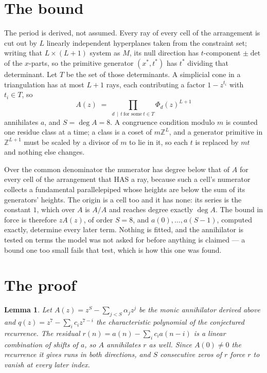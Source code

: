 \documentclass[11pt,a4paper]{article}
\theoremstyle{plain}
\newtheorem{lemma}[theorem]{Lemma}
\theoremstyle{definition}
\begin{document}
\section{The bound}

The period is derived, not assumed. Every ray of every cell of the arrangement is cut out by
$L$ linearly independent hyperplanes taken from the constraint set; writing that $L\times(L+1)$
system as $M$, its null direction has $t$-component $\pm\det$ of the $x$-parts, so the
primitive generator $(x^*,t^*)$ has $t^*$ dividing that determinant. Let $T$ be the set of
those determinants. A simplicial cone in a triangulation has at most $L+1$ rays, each
contributing a factor $1-z^{t_i}$ with $t_i\in T$, so
\[
A(z)\;=\;\prod_{d\,\mid\,t\ \text{for some}\ t\in T}\Phi_d(z)^{L+1}
\]
annihilates $a$, and $S=\deg A=8$. A congruence condition modulo $m$ is counted one residue
class at a time; a class is a coset of $m\mathbb{Z}^L$, and a generator primitive in
$\mathbb{Z}^{L+1}$ must be scaled by a divisor of $m$ to lie in it, so each $t$ is replaced
by $mt$ and nothing else changes.

Over the common denominator the numerator has degree below that of $A$ for every cell of the
arrangement that HAS a ray, because such a cell's numerator collects a fundamental
parallelepiped whose heights are below the sum of its generators' heights. The origin is a cell
too and it has none: its series is the constant $1$, which over $A$ is $A/A$ and reaches degree
exactly $\deg A$. The bound in force is therefore $zA(z)$, of order $S=8$, and
$a(0),\dots,a(S-1)$, computed exactly, determine every later term. Nothing is fitted, and the
annihilator is tested on terms the model was not asked for before anything is claimed --- a
bound one too small fails that test, which is how this one was found.

\section{The proof}

\begin{lemma}\label{lem:crit}
Let $A(z)=z^S-\sum_{j<S}\alpha_jz^{j}$ be the monic annihilator derived above and
$q(z)=z^{7}-\sum_ic_iz^{7-i}$ the characteristic polynomial of the conjectured
recurrence. The residual $r(n)=a(n)-\sum_ic_ia(n-i)$ is a linear combination of shifts of $a$,
so $A$ annihilates $r$ as well. Since $A(0)\ne0$ the recurrence it gives runs in both
directions, and $S$ consecutive zeros of $r$ force $r$ to vanish at every later index.
\end{lemma}
\end{document}
